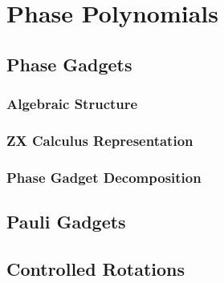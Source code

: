 \chapter{\label{ch:4-phase-polynomials}Phase Polynomials}

\section{Phase Gadgets}
\subsection{Algebraic Structure}
\subsection{ZX Calculus Representation}
\subsection{Phase Gadget Decomposition}

\section{Pauli Gadgets}

\section{Controlled Rotations}
